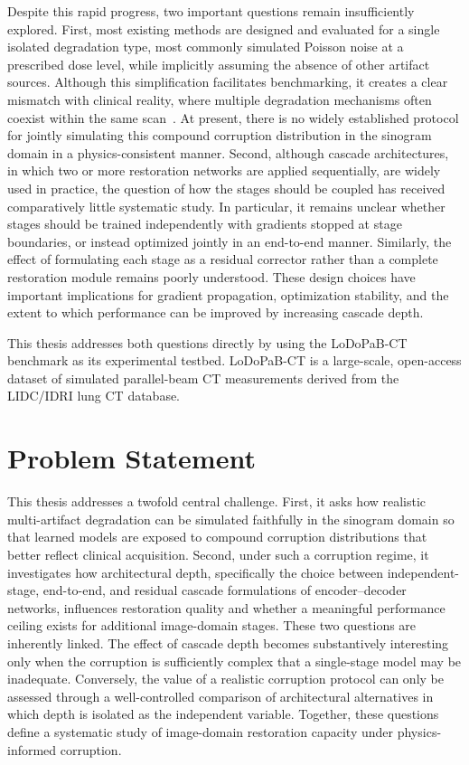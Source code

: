 Despite this rapid progress, two important questions remain insufficiently explored. First, most existing methods are designed and evaluated for a single isolated degradation type, most commonly simulated Poisson noise at a prescribed dose level, while implicitly assuming the absence of other artifact sources. Although this simplification facilitates benchmarking, it creates a clear mismatch with clinical reality, where multiple degradation mechanisms often coexist within the same scan~\cite{Boas2012, Liang2025}. At present, there is no widely established protocol for jointly simulating this compound corruption distribution in the sinogram domain in a physics-consistent manner. Second, although cascade architectures, in which two or more restoration networks are applied sequentially, are widely used in practice, the question of how the stages should be coupled has received comparatively little systematic study. In particular, it remains unclear whether stages should be trained independently with gradients stopped at stage boundaries, or instead optimized jointly in an end-to-end manner. Similarly, the effect of formulating each stage as a residual corrector rather than a complete restoration module remains poorly understood. These design choices have important implications for gradient propagation, optimization stability, and the extent to which performance can be improved by increasing cascade depth.

This thesis addresses both questions directly by using the LoDoPaB-CT benchmark \cite{Leuschner2021} as its experimental testbed. LoDoPaB-CT is a large-scale, open-access dataset of simulated parallel-beam CT measurements derived from the LIDC/IDRI lung CT database.

\section{Problem Statement}
\label{sec:intro_problem}

This thesis addresses a twofold central challenge. First, it asks how realistic multi-artifact degradation can be simulated faithfully in the sinogram domain so that learned models are exposed to compound corruption distributions that better reflect clinical acquisition. Second, under such a corruption regime, it investigates how architectural depth, specifically the choice between independent-stage, end-to-end, and residual cascade formulations of encoder--decoder networks, influences restoration quality and whether a meaningful performance ceiling exists for additional image-domain stages. These two questions are inherently linked. The effect of cascade depth becomes substantively interesting only when the corruption is sufficiently complex that a single-stage model may be inadequate. Conversely, the value of a realistic corruption protocol can only be assessed through a well-controlled comparison of architectural alternatives in which depth is isolated as the independent variable. Together, these questions define a systematic study of image-domain restoration capacity under physics-informed corruption.

